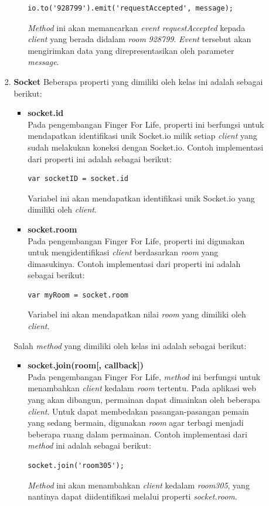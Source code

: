 \begin{enumerate}
\begin{enumerate}
\begin{enumerate}
\begin{itemize}
\begin{lstlisting}
io.to('928799').emit('requestAccepted', message);
\end{lstlisting}
				\textit{Method} ini akan memancarkan \textit{event} \textit{requestAccepted} kepada \textit{client} yang berada didalam \textit{room} \textit{928799}. \textit{Event} tersebut akan mengirimkan data yang direpresentasikan oleh parameter \textit{message}.

			\end{itemize}
		
			\item \textbf{Socket}
			Beberapa properti yang dimiliki oleh kelas ini adalah sebagai berikut:
			\begin{itemize}
				\item \textbf{socket.id} \\
				Pada pengembangan Finger For Life, properti ini berfungsi untuk mendapatkan identifikasi unik Socket.io milik setiap \textit{client} yang sudah melakukan koneksi dengan Socket.io. Contoh implementasi dari properti ini adalah sebagai berikut:
\begin{lstlisting}
var socketID = socket.id
\end{lstlisting}
				Variabel ini akan mendapatkan identifikasi unik Socket.io yang dimiliki oleh \textit{client}. 
				
				\item \textbf{socket.room} \\
				Pada pengembangan Finger For Life, properti ini digunakan untuk mengidentifikasi \textit{client} berdasarkan \textit{room} yang dimasukinya. Contoh implementasi dari properti ini adalah sebagai berikut:
\begin{lstlisting}
var myRoom = socket.room
\end{lstlisting}
				Variabel ini akan mendapatkan nilai \textit{room} yang dimiliki oleh \textit{client}.

			\end{itemize}
		
			Salah \textit{method} yang dimiliki oleh kelas ini adalah sebagai berikut:
			\begin{itemize}
				\item \textbf{socket.join(room[, callback])} \\
				Pada pengembangan Finger For Life, \textit{method} ini berfungsi untuk menambahkan \textit{client} kedalam \textit{room} tertentu. Pada aplikasi web yang akan dibangun, permainan dapat dimainkan oleh beberapa \textit{client}. Untuk dapat membedakan pasangan-pasangan pemain yang sedang bermain, digunakan \textit{room} agar terbagi menjadi beberapa ruang dalam permainan. Contoh implementasi dari \textit{method} ini adalah sebagai berikut:
\begin{lstlisting}
socket.join('room305');
\end{lstlisting}
				\textit{Method} ini akan menambahkan \textit{client} kedalam \textit{room305}, yang nantinya dapat diidentifikasi melalui properti \textit{socket.room}.


\end{itemize}
\end{enumerate}
\end{enumerate}
\end{enumerate}

